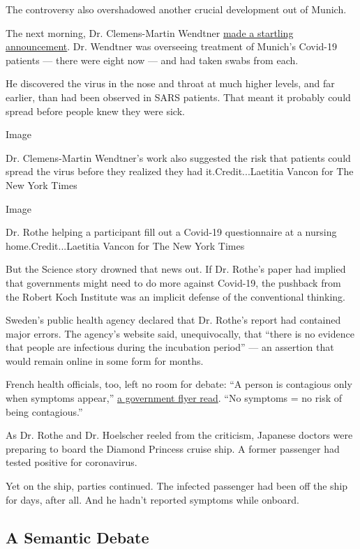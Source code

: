 The controversy also overshadowed another crucial development out of
Munich.

The next morning, Dr. Clemens-Martin Wendtner
\href{https://instmikrobiobw.de/aktuelles/ansicht/pressemitteilung}{made
a startling announcement}. Dr. Wendtner was overseeing treatment of
Munich's Covid-19 patients --- there were eight now --- and had taken
swabs from each.

He discovered the virus in the nose and throat at much higher levels,
and far earlier, than had been observed in SARS patients. That meant it
probably could spread before people knew they were sick.

Image

Dr. Clemens-Martin Wendtner's work also suggested the risk that patients
could spread the virus before they realized they had
it.Credit...Laetitia Vancon for The New York Times

Image

Dr. Rothe helping a participant fill out a Covid-19 questionnaire at a
nursing home.Credit...Laetitia Vancon for The New York Times

But the Science story drowned that news out. If Dr. Rothe's paper had
implied that governments might need to do more against Covid-19, the
pushback from the Robert Koch Institute was an implicit defense of the
conventional thinking.

Sweden's public health agency declared that Dr. Rothe's report had
contained major errors. The agency's website said, unequivocally, that
``there is no evidence that people are infectious during the incubation
period'' --- an assertion that would remain online in some form for
months.

French health officials, too, left no room for debate: ``A person is
contagious only when symptoms appear,''
\href{https://www.lemonde.fr/les-decodeurs/article/2020/02/06/coronavirus-une-affiche-du-ministere-ecarte-trop-vite-le-risque-de-contagion-lors-de-l-incubation_6028658_4355770.html}{a
government flyer read}. ``No symptoms = no risk of being contagious.''

As Dr. Rothe and Dr. Hoelscher reeled from the criticism, Japanese
doctors were preparing to board the Diamond Princess cruise ship. A
former passenger had tested positive for coronavirus.

Yet on the ship, parties continued. The infected passenger had been off
the ship for days, after all. And he hadn't reported symptoms while
onboard.

\hypertarget{a-semantic-debate}{%
\subsection{A Semantic Debate}\label{a-semantic-debate}}

